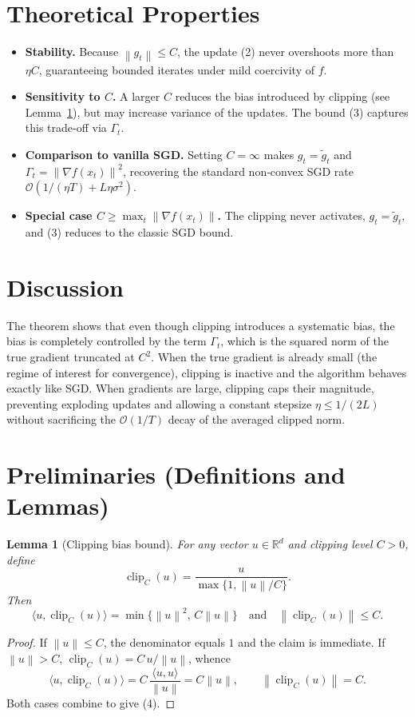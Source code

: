 \documentclass{article}
\newtheorem{lemma}{Lemma}
\newcommand{\norm}[1]{\left\lVert #1\right\rVert}
\begin{document}
\section*{Theoretical Properties}
\begin{itemize}
\item \textbf{Stability.} Because $\norm{g_t}\le C$, the update (2) never overshoots more than $\eta C$, guaranteeing bounded iterates under mild coercivity of $f$.
\item \textbf{Sensitivity to $C$.} A larger $C$ reduces the bias introduced by clipping (see Lemma~\ref{lem:bias}), but may increase variance of the updates. The bound (3) captures this trade‑off via $\Gamma_t$.
\item \textbf{Comparison to vanilla SGD.} Setting $C=\infty$ makes $g_t=\tilde g_t$ and $\Gamma_t=\norm{\nabla f(x_t)}^2$, recovering the standard non‑convex SGD rate $\mathcal{O}(1/(\eta T)+L\eta\sigma^2)$.
\item \textbf{Special case $C\ge \max_t\norm{\nabla f(x_t)}$.} The clipping never activates, $g_t=\tilde g_t$, and (3) reduces to the classic SGD bound.
\end{itemize}

\section*{Discussion}
The theorem shows that even though clipping introduces a systematic bias, the bias is completely controlled by the term $\Gamma_t$, which is the squared norm of the true gradient truncated at $C^2$. When the true gradient is already small (the regime of interest for convergence), clipping is inactive and the algorithm behaves exactly like SGD. When gradients are large, clipping caps their magnitude, preventing exploding updates and allowing a constant stepsize $\eta\le 1/(2L)$ without sacrificing the $\mathcal{O}(1/T)$ decay of the averaged clipped norm.

\newpage

\section*{Preliminaries (Definitions and Lemmas)}
\begin{lemma}[Clipping bias bound]\label{lem:bias}
For any vector $u\in\mathbb{R}^d$ and clipping level $C>0$, define
\[
\operatorname{clip}_C(u)=\frac{u}{\max\{1,\norm{u}/C\}}.
\]
Then
\[
\bigl\langle u,\operatorname{clip}_C(u)\bigr\rangle
= \min\{\norm{u}^2,\,C\norm{u}\}
\quad\text{and}\quad
\norm{\operatorname{clip}_C(u)}\le C .
\tag{4}
\]
\end{lemma}
\begin{proof}
If $\norm{u}\le C$, the denominator equals $1$ and the claim is immediate.
If $\norm{u}>C$, $\operatorname{clip}_C(u)=C\,u/\norm{u}$, whence
\[
\langle u,\operatorname{clip}_C(u)\rangle
= C\,\frac{\langle u,u\rangle}{\norm{u}}=C\norm{u},
\qquad
\norm{\operatorname{clip}_C(u)}=C .
\]
Both cases combine to give (4). \hfill\qedsymbol
\end{proof}
\end{document}
